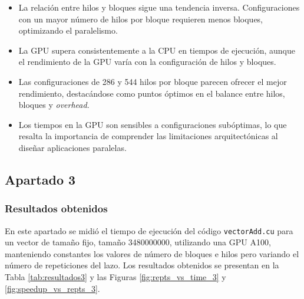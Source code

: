 \documentclass{article}
\begin{document}
			\begin{itemize}

				\item La relación entre hilos y bloques sigue una tendencia inversa. Configuraciones con un mayor número de hilos por bloque requieren menos bloques, optimizando el paralelismo.

				\item La GPU supera consistentemente a la CPU en tiempos de ejecución, aunque el rendimiento de la GPU varía con la configuración de hilos y bloques.

				\item Las configuraciones de 286 y 544 hilos por bloque parecen ofrecer el mejor rendimiento, destacándose como puntos óptimos en el balance entre hilos, bloques y \textit{overhead}.

				\item Los tiempos en la GPU son sensibles a configuraciones subóptimas, lo que resalta la importancia de comprender las limitaciones arquitectónicas al diseñar aplicaciones paralelas.

			\end{itemize}

	\subsection{Apartado 3}

		\subsubsection{Resultados obtenidos}

			En este apartado se midió el tiempo de ejecución del código \texttt{vectorAdd.cu} para un vector de tamaño fijo, tamaño 3480000000, utilizando una GPU A100, manteniendo constantes los valores de número de bloques e hilos pero variando el número de repeticiones del lazo. Los resultados obtenidos se presentan en la Tabla \ref{tab:resultados3} y las Figuras \ref{fig:repts_vs_time_3} y \ref{fig:speedup_vs_repts_3}.
\end{document}
